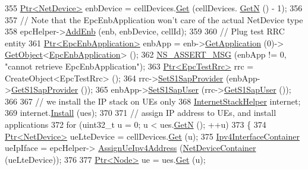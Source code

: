 \begin{DoxyCode}
355       \hyperlink{classns3_1_1Ptr}{Ptr<NetDevice>} enbDevice = cellDevices.\hyperlink{classns3_1_1NetDeviceContainer_a677d62594b5c9d2dea155cc5045f4d0b}{Get} (cellDevices.
      \hyperlink{classns3_1_1NetDeviceContainer_a74cafc212479bc38976bebd118e856b9}{GetN} () - 1);
356 
357       \textcolor{comment}{// Note that the EpcEnbApplication won't care of the actual NetDevice type}
358       epcHelper->\hyperlink{classns3_1_1PointToPointEpcHelper_a6636cc9c0501b719bd81ed13efd3c589}{AddEnb} (enb, enbDevice, cellId);      
359       
360        \textcolor{comment}{// Plug test RRC entity}
361       \hyperlink{classns3_1_1Ptr}{Ptr<EpcEnbApplication>} enbApp = enb->\hyperlink{classns3_1_1Node_ad0ab54d76712398c0a8e25d9ac59ea41}{GetApplication} (0)->
      \hyperlink{classns3_1_1Object_a13e18c00017096c8381eb651d5bd0783}{GetObject}<\hyperlink{classns3_1_1EpcEnbApplication}{EpcEnbApplication}> ();
362       \hyperlink{assert_8h_aff5ece9066c74e681e74999856f08539}{NS\_ASSERT\_MSG} (enbApp != 0, \textcolor{stringliteral}{"cannot retrieve EpcEnbApplication"});
363       \hyperlink{classns3_1_1Ptr}{Ptr<EpcTestRrc>} rrc = CreateObject<EpcTestRrc> ();
364       rrc->\hyperlink{classns3_1_1EpcTestRrc_a4dc91a1208c2f22d76991df2f2bd15dc}{SetS1SapProvider} (enbApp->\hyperlink{classns3_1_1EpcEnbApplication_a706b531d6ec3ab6eb37567232f5c6cd4}{GetS1SapProvider} ());
365       enbApp->\hyperlink{classns3_1_1EpcEnbApplication_aec298b6adc29bad4c52828ddf1a260d6}{SetS1SapUser} (rrc->\hyperlink{classns3_1_1EpcTestRrc_ac145e0e646ca9d170ed04d6b3b3b93c4}{GetS1SapUser} ());
366       
367       \textcolor{comment}{// we install the IP stack on UEs only}
368       \hyperlink{classns3_1_1InternetStackHelper}{InternetStackHelper} internet;
369       internet.\hyperlink{classns3_1_1InternetStackHelper_a6645b412f31283d2d9bc3d8a95cebbc0}{Install} (ues);
370 
371       \textcolor{comment}{// assign IP address to UEs, and install applications}
372       \textcolor{keywordflow}{for} (uint32\_t u = 0; u < ues.\hyperlink{classns3_1_1NodeContainer_aed647ac56d0407a7706aba02eb44b951}{GetN} (); ++u)
373         \{
374           \hyperlink{classns3_1_1Ptr}{Ptr<NetDevice>} ueLteDevice = cellDevices.\hyperlink{classns3_1_1NetDeviceContainer_a677d62594b5c9d2dea155cc5045f4d0b}{Get} (u);
375           \hyperlink{classns3_1_1Ipv4InterfaceContainer}{Ipv4InterfaceContainer} ueIpIface = epcHelper->
      \hyperlink{classns3_1_1PointToPointEpcHelper_a11102d32127163fdcc47c44623d4f0cc}{AssignUeIpv4Address} (\hyperlink{classns3_1_1NetDeviceContainer}{NetDeviceContainer} (ueLteDevice));
376 
377           \hyperlink{classns3_1_1Ptr}{Ptr<Node>} ue = ues.\hyperlink{classns3_1_1NodeContainer_a9ed96e2ecc22e0f5a3d4842eb9bf90bf}{Get} (u);

\end{DoxyCode}

